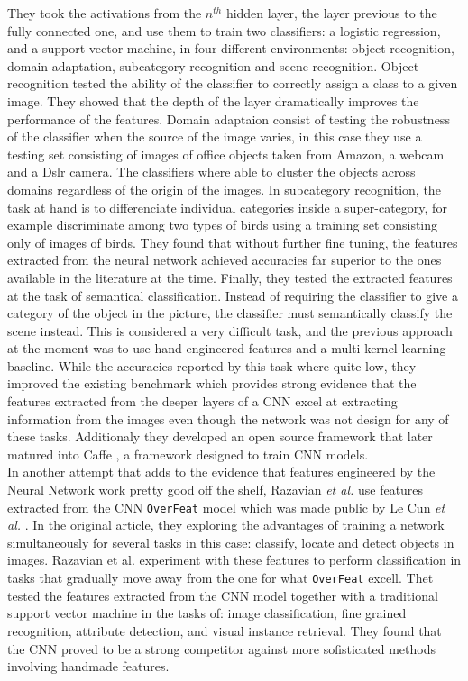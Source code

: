 They took the activations from the $n^{th}$ hidden layer, the layer previous to the fully connected one, and use them to train two classifiers: a logistic regression, and a support vector machine, in four different environments: object recognition, domain adaptation, subcategory recognition and scene recognition. Object recognition tested the ability of the classifier to correctly assign a class to a given image. They showed that the depth of the layer dramatically improves the performance of the features. Domain adaptaion consist of testing the robustness of the classifier when the source of the image varies, in this case they use a testing set consisting of images of office objects taken from Amazon, a webcam and a Dslr camera. The classifiers where able to cluster the objects across domains regardless of the origin of the images. In subcategory recognition, the task at hand is to differenciate individual categories inside a super-category, for example discriminate among two types of birds using a training set consisting only of images of birds. They found that without further fine tuning, the features extracted from the neural network achieved accuracies far superior to the ones available in the literature at the time. Finally, they tested the extracted features at the task of semantical classification. Instead of requiring the classifier to give a category of the object in the picture, the classifier must semantically classify the scene instead. This is considered a very difficult task, and the previous approach at the moment was to use hand-engineered features and a multi-kernel learning baseline. While the accuracies reported by this task where quite low, they improved the existing benchmark which provides strong evidence that the features extracted from the deeper layers of a CNN excel at extracting information from the images even though the network was not design for any of these tasks. Additionaly they developed an open source framework that later matured into Caffe \cite{jia2014caffe}, a framework designed to train CNN models.\\


In another attempt that adds to the evidence that features engineered by the Neural Network work pretty good off the shelf, Razavian \textit{et al.} \cite{DBLP:journals/corr/RazavianASC14} use features extracted from the CNN \texttt{OverFeat} model which was made public by Le Cun \textit{et al.} \cite{DBLP:journals/corr/SermanetEZMFL13}. In the original article, they exploring the advantages of training a network simultaneously for several tasks in this case: classify, locate and detect objects in images. Razavian {et al.} experiment with these features to perform classification in tasks that gradually move away from the one for what \texttt{OverFeat} excell. Thet tested the features extracted from the CNN model together with a traditional support vector machine in the tasks of: image classification, fine grained recognition, attribute detection, and visual instance retrieval. They found that the CNN proved to be a strong competitor against more sofisticated methods involving handmade features.\\

